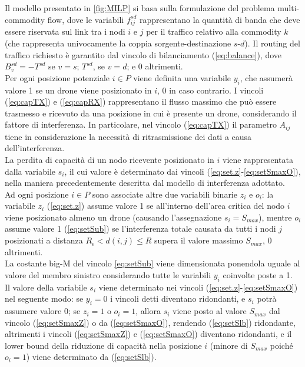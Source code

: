 Il modello presentato in \figurename \ref{fig:MILP} si basa sulla formulazione del problema multi-commodity flow, dove le variabili $f^{sd}_{ij}$ rappresentano la quantità di banda che deve essere riservata sul link tra i nodi $i$ e $j$ per il traffico relativo alla commodity $k$ (che rappresenta univocamente la coppia sorgente-destinazione $s$-$d$). 
Il routing del traffico richiesto è garantito dal vincolo di bilanciamento (\ref{eq:balance}), dove $B^{sd}_{v} = - T^{sd}$ se $v = s$; $T^{sd}$, se $v = d$; e 0 altrimenti. \\
Per ogni posizione potenziale $i \in P$ viene definita una variabile $y_i$, che assumerà valore 1 se un drone viene posizionato in $i$, 0 in caso contrario.   
I vincoli (\ref{eq:capTX}) e (\ref{eq:capRX}) rappresentano il flusso massimo che può essere trasmesso e ricevuto da una posizione in cui è presente un drone, considerando il fattore di interferenza. In particolare, nel vincolo (\ref{eq:capTX}) il parametro $A_{ij}$ tiene in considerazione la necessità di ritrasmissione dei dati a causa dell'interferenza.\\
La perdita di capacità di un nodo ricevente posizionato in $i$ viene rappresentata dalla variabile $s_i$, il cui valore è determinato dai vincoli (\ref{eq:set.z}-\ref{eq:setSmaxO}), nella maniera precedentemente descritta dal modello di interferenza adottato. \\
Ad ogni posizione $i \in P$ sono associate altre due variabili binarie $z_i$ e $o_i$: la variabile $z_i$ (\ref{eq:set.z}) assume valore 1 se all'interno dell'area critica del nodo $i$ viene posizionato almeno un drone (causando l'assegnazione $s_i = S_{max}$), mentre $o_i$ assume valore 1 (\ref{eq:setSub}) se l'interferenza totale causata da tutti i nodi $j$ posizionati a distanza $R_\epsilon < d(i,j) \leq R$ supera il valore massimo $S_{max}$, 0 altrimenti. \\
La costante big-M del vincolo \ref{eq:setSub} viene dimensionata ponendola uguale al valore del membro sinistro considerando tutte le variabili $y_i$ coinvolte poste a 1.\\ 
Il valore della variabile $s_i$ viene determinato nei vincoli (\ref{eq:set.z}-\ref{eq:setSmaxO}) nel seguente modo: se $y_i = 0$ i vincoli detti diventano ridondanti, e $s_i$ potrà assumere valore 0; se $z_i = 1$ o $o_i = 1$, allora $s_i$ viene posto al valore $S_{max}$ dal vincolo (\ref{eq:setSmaxZ}) o da (\ref{eq:setSmaxO}), rendendo (\ref{eq:setSlb}) ridondante, altrimenti i vincoli (\ref{eq:setSmaxZ}) e (\ref{eq:setSmaxO}) diventano ridondanti, e il lower bound della riduzione di capacità nella posizione $i$ (minore di $S_{max}$ poiché $o_i = 1$) viene determinato da (\ref{eq:setSlb}).  \\

